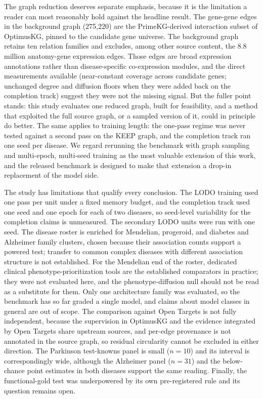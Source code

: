 \documentclass[11pt]{article}
\begin{document}
The graph reduction deserves separate emphasis, because it is the limitation a reader can most reasonably hold against the headline result. The gene-gene edges in the background graph (275,220) are the PrimeKG-derived interaction subset of OptimusKG, pinned to the candidate gene universe. The background graph retains ten relation families and excludes, among other source content, the 8.8 million anatomy-gene expression edges. Those edges are broad expression annotations rather than disease-specific co-expression modules, and the direct measurements available (near-constant coverage across candidate genes; unchanged degree and diffusion floors when they were added back on the completion track) suggest they were not the missing signal. But the fuller point stands: this study evaluates one reduced graph, built for feasibility, and a method that exploited the full source graph, or a sampled version of it, could in principle do better. The same applies to training length: the one-pass regime was never tested against a second pass on the KEEP graph, and the completion track ran one seed per disease. We regard rerunning the benchmark with graph sampling and multi-epoch, multi-seed training as the most valuable extension of this work, and the released benchmark is designed to make that extension a drop-in replacement of the model side.

The study has limitations that qualify every conclusion. The LODO training used one pass per unit under a fixed memory budget, and the completion track used one seed and one epoch for each of two diseases, so seed-level variability for the completion claims is unmeasured. The secondary LODO units were run with one seed. The disease roster is enriched for Mendelian, progeroid, and diabetes and Alzheimer family clusters, chosen because their association counts support a powered test; transfer to common complex diseases with different association structure is not established. For the Mendelian end of the roster, dedicated clinical phenotype-prioritization tools are the established comparators in practice; they were not evaluated here, and the phenotype-diffusion null should not be read as a substitute for them. Only one architecture family was evaluated, so the benchmark has so far graded a single model, and claims about model classes in general are out of scope. The comparison against Open Targets is not fully independent, because the supervision in OptimusKG and the evidence integrated by Open Targets share upstream sources, and per-edge provenance is not annotated in the source graph, so residual circularity cannot be excluded in either direction. The Parkinson test-knowns panel is small ($n = 10$) and its interval is correspondingly wide, although the Alzheimer panel ($n = 31$) and the below-chance point estimates in both diseases support the same reading. Finally, the functional-gold test was underpowered by its own pre-registered rule and its question remains open.
\end{document}
